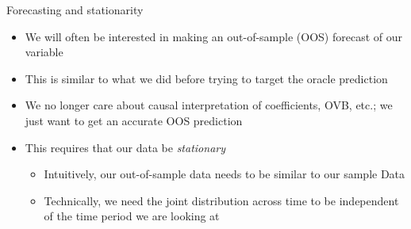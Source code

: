 \documentclass[aspectratio=169]{beamer}
\begin{document}
\begin{frame}{Forecasting and stationarity}
    \begin{itemize}
       \item We will often be interested in making an out-of-sample (OOS) forecast of our variable
       \item This is similar to what we did before trying to target the oracle prediction
       \item We no longer care about causal interpretation of coefficients, OVB, etc.; we just want to get an accurate OOS prediction
       \item This requires that our data be \textit{stationary}
       \begin{itemize}
        \item Intuitively, our out-of-sample data needs to be similar to our sample Data
        \item Technically, we need the joint distribution across time to be independent of the time period we are looking at
       \end{itemize}
    \end{itemize}
\end{frame}

\end{document}
